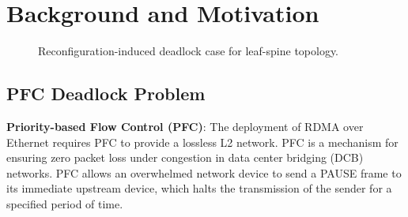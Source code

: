 \section{Background and Motivation}\label{sec:background}

\begin{figure}[t]
	\centering
	
	
	\caption{Reconfiguration-induced deadlock case for leaf-spine topology.}\label{fig:treecase}
	
\end{figure}

\subsection{PFC Deadlock Problem}\label{subsec:pfcdeadlock}


\textbf{Priority-based Flow Control (PFC)}: The deployment of RDMA over Ethernet requires PFC  to provide a lossless L2 network. PFC is a mechanism for ensuring zero packet loss under congestion in data center bridging (DCB) networks. PFC allows an overwhelmed network device to send a PAUSE frame to its immediate upstream device, which halts the transmission of the sender for a specified period of time.  


